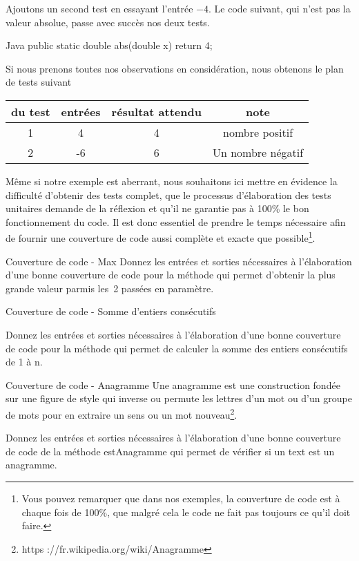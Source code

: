 \documentclass[a4paper,11pt]{article}
\begin{document}
	Ajoutons un second test en essayant l'entrée $-4$. Le code suivant, qui n'est pas la valeur absolue, passe avec succès nos deux tests. 

	\begin{Code}{Java}
		public static double abs(double x) {
			return 4;
		}
	\end{Code}

	Si nous prenons toutes nos observations en considération, nous obtenons le plan de tests suivant

	\begin{center}
		\begin{tabular}{|c|c|c|c|}
			\hline
			\no du test & entrées & résultat attendu & note \\
			\hline
			1 & 4 & 4 & nombre positif \\
			\hline
			2 & -6 & 6 & Un nombre négatif \\
			\hline
		\end{tabular}
	\end{center}

	Même si notre exemple est aberrant, nous souhaitons ici mettre en évidence la difficulté d'obtenir des tests complet, que le processus d’élaboration des tests unitaires demande de la réflexion et qu’il ne garantie pas à 100\% le bon fonctionnement du code. Il est donc essentiel de prendre le temps nécessaire afin de fournir une couverture de code aussi complète et exacte que possible\footnote{Vous pouvez remarquer que dans nos exemples, la couverture de code est à chaque fois de 100\%, que malgré cela le code ne fait pas toujours ce qu'il doit faire.}.

	\begin{Exercice}{Couverture de code - Max}
		Donnez les entrées et sorties nécessaires à l’élaboration d’une bonne couverture de code pour la méthode  qui permet d’obtenir la plus grande valeur parmis les~2 passées en paramètre.
	\end{Exercice}

	\begin{Exercice}{Couverture de code - Somme d'entiers consécutifs}
		
		Donnez les entrées et sorties nécessaires à l’élaboration d’une bonne couverture de code pour la méthode qui permet de calculer la somme des entiers consécutifs de 1 à n.
	\end{Exercice}

	\begin{Exercice}{Couverture de code - Anagramme}
		Une anagramme est une construction fondée sur une figure de style qui inverse ou permute les lettres d’un mot ou d’un groupe de mots pour en extraire un sens ou un mot nouveau\footnote{https ://fr.wikipedia.org/wiki/Anagramme}. 

		Donnez les entrées et sorties nécessaires à l’élaboration d’une bonne couverture de code de la méthode estAnagramme qui permet de vérifier si un text est un anagramme.
	\end{Exercice}
\end{document}

